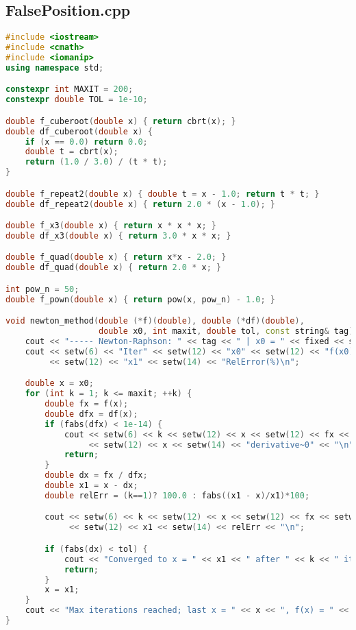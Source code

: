 \documentclass[12pt,a4paper]{article}
\begin{document}
\subsection{FalsePosition.cpp}
\begin{lstlisting}[language=C++, caption={Demonstration of Root-Finding Failures}, label={lst:rootfailure}]
#include <iostream>
#include <cmath>
#include <iomanip>
using namespace std;

constexpr int MAXIT = 200;
constexpr double TOL = 1e-10;

double f_cuberoot(double x) { return cbrt(x); }
double df_cuberoot(double x) {
    if (x == 0.0) return 0.0;
    double t = cbrt(x);
    return (1.0 / 3.0) / (t * t);
}

double f_repeat2(double x) { double t = x - 1.0; return t * t; }
double df_repeat2(double x) { return 2.0 * (x - 1.0); }

double f_x3(double x) { return x * x * x; }
double df_x3(double x) { return 3.0 * x * x; }

double f_quad(double x) { return x*x - 2.0; }
double df_quad(double x) { return 2.0 * x; }

int pow_n = 50;
double f_pown(double x) { return pow(x, pow_n) - 1.0; }

void newton_method(double (*f)(double), double (*df)(double),
                   double x0, int maxit, double tol, const string& tag) {
    cout << "----- Newton-Raphson: " << tag << " | x0 = " << fixed << setprecision(6) << x0 << " -----\n";
    cout << setw(6) << "Iter" << setw(12) << "x0" << setw(12) << "f(x0)" << setw(12) << "f'(x0)"
         << setw(12) << "x1" << setw(14) << "RelError(%)\n";

    double x = x0;
    for (int k = 1; k <= maxit; ++k) {
        double fx = f(x);
        double dfx = df(x);
        if (fabs(dfx) < 1e-14) {
            cout << setw(6) << k << setw(12) << x << setw(12) << fx << setw(12) << 0
                 << setw(12) << x << setw(14) << "derivative~0" << "\n";
            return;
        }
        double dx = fx / dfx;
        double x1 = x - dx;
        double relErr = (k==1)? 100.0 : fabs((x1 - x)/x1)*100;

        cout << setw(6) << k << setw(12) << x << setw(12) << fx << setw(12) << dfx
             << setw(12) << x1 << setw(14) << relErr << "\n";

        if (fabs(dx) < tol) {
            cout << "Converged to x = " << x1 << " after " << k << " iterations, f(x)= " << f(x1) << "\n";
            return;
        }
        x = x1;
    }
    cout << "Max iterations reached; last x = " << x << ", f(x) = " << f(x) << "\n";
}


\end{lstlisting}
\end{document}
